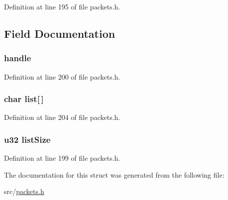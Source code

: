 Definition at line 195 of file packets.\+h.



\subsection{Field Documentation}
\hypertarget{struct_l_i_s_t___f_i_l_e_s___r_e_p_l_y_aecb23f809384319c09f5c91846a0a49e}{}
\subsubsection[{handle}]{ handle}\label{struct_l_i_s_t___f_i_l_e_s___r_e_p_l_y_aecb23f809384319c09f5c91846a0a49e}


Definition at line 200 of file packets.\+h.

\hypertarget{struct_l_i_s_t___f_i_l_e_s___r_e_p_l_y_aff445b895fa0846e460f0c83e186647d}{}
\subsubsection[{list}]{\setlength{\rightskip}{0pt plus 5cm}char list\mbox{[}$\,$\mbox{]}}\label{struct_l_i_s_t___f_i_l_e_s___r_e_p_l_y_aff445b895fa0846e460f0c83e186647d}


Definition at line 204 of file packets.\+h.

\hypertarget{struct_l_i_s_t___f_i_l_e_s___r_e_p_l_y_a5a4efbe028da0ce77ddfd353ff9dacef}{}
\subsubsection[{list\+Size}]{ {\bf u32} list\+Size}\label{struct_l_i_s_t___f_i_l_e_s___r_e_p_l_y_a5a4efbe028da0ce77ddfd353ff9dacef}


Definition at line 199 of file packets.\+h.



The documentation for this struct was generated from the following file\+:\begin{DoxyCompactItemize}
\item 
src/\hyperlink{packets_8h}{packets.\+h}\end{DoxyCompactItemize}
